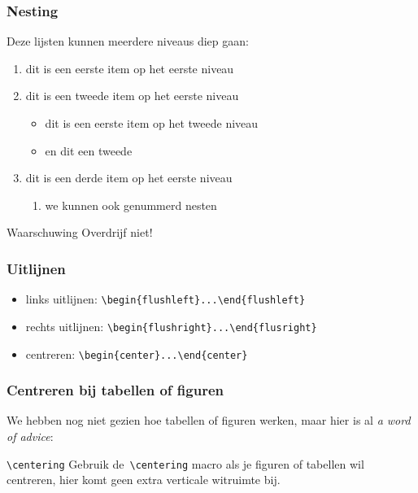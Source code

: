 \begin{frame}
  \frametitle{Nesting}

  Deze lijsten kunnen meerdere niveaus diep gaan:
  \begin{enumerate}
	\item dit is een eerste item op het eerste niveau
	\item dit is een tweede item op het eerste niveau
	  \begin{itemize}
		\item dit is een eerste item op het tweede niveau
		\item en dit een tweede
	  \end{itemize}
	\item dit is een derde item op het eerste niveau
	  \begin{enumerate}
		\item we kunnen ook genummerd nesten
	  \end{enumerate}
  \end{enumerate}

  \begin{alertblock}{Waarschuwing}
	Overdrijf niet!
  \end{alertblock}
\end{frame}


\begin{frame}
  \frametitle{Uitlijnen}

  \begin{itemize}
    \item links uitlijnen: \texttt{\textcolor{uagreen}{\textbackslash begin}\{flushleft\}...\textcolor{uagreen}{\textbackslash end}\{flushleft\}}
    \item rechts uitlijnen: \texttt{\textcolor{uagreen}{\textbackslash begin}\{flushright\}...\textcolor{uagreen}{\textbackslash end}\{flusright\}}
    \item centreren: \texttt{\textcolor{uagreen}{\textbackslash begin}\{center\}...\textcolor{uagreen}{\textbackslash end}\{center\}}
  \end{itemize}
\end{frame}

\begin{frame}[fragile]
  \frametitle{Centreren bij tabellen of figuren}

  We hebben nog niet gezien hoe tabellen of figuren werken, maar hier is al \emph{a word of advice}:
  \begin{exampleblock}{\texttt{\textbackslash centering}}
    Gebruik de~\texttt{\textcolor{uagreen}{\textbackslash centering}} macro als je figuren of tabellen wil centreren, hier komt geen extra verticale witruimte bij.
  \end{exampleblock}
\end{frame}

